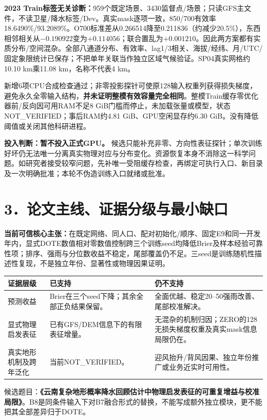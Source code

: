\documentclass[UTF8,a4paper,10pt,fontset=none]{ctexart}
\begin{document}
\textbf{2023 Train标签无关诊断：}959个既定场景、3430监督点/场景；只读GFS主文件，不读卫星/降水标签/Dev。真实mask逐项一致，850/700有效率18.6490\%/93.2089\%。O700标准差从0.266514降至0.211836（约减少20.5\%），东西相邻相关从$-0.190922$变为$+0.114056$；联合置乱为$+0.001210$。因此两方案都有实质分布/空间混杂。全部八通道分布、有效率、lag1/3相关、海拔/经纬、月/UTC/固定象限统计已保存；不把单年关联当作独立区域气候验证。SP04真实网格约10.10 km乘11.08 km，名称不代表4 km。

新增6项CPU合成检查通过；非零投影探针可使原128输入权重列获得损失梯度，避免永久全零输入结构，\textbf{并未证明整模有效容量完全相同}。整模Train缓存零优化器前/反向因可用RAM不足8 GiB门槛而停止，未加载张量或模型，状态NOT\_VERIFIED；事后RAM约4.81 GiB、GPU空闲显存约6.30 GiB。没有降低阈值或关闭其他科研进程。

\textbf{投入判断：暂不投入正式GPU。} 候选只能补充非零、方向性表征探针；单次训练好坏仍无法唯一分离真实物理对应与分布变化。资源恢复本身不消除这一科学问题。如研究者接受较窄问题，先补唯一受阻缓存检查，再绑定可执行入口、新目录及一次明确批准；本轮不伪造训练入口就绪或批准。
\newpage

\section*{3．论文主线、证据分级与最小缺口}
\textbf{当前可信核心主张：}在既定网络、同人口、配对初始化/顺序、固定E9和同一开发年内，显式DOTE数值相对零数值控制跨三个训练seed均降低Brier及样本经验可靠性项；排序、强雨与分位数收益不稳定，尾部覆盖仍不足。三seed是训练随机性描述性复现，不是独立年份、显著性或物理因果证明。

\begin{tabularx}{\linewidth}{@{}p{32mm}XX@{}}
\toprule
证据层级 & 已支持 & 仍不支持\\
\midrule
预测收益 & Brier在三个seed下降；其余全部正负结果保留。 & 全面优越、稳定20--50强雨改善、尾部校准解决。\\
显式物理启发表征 & 已有GFS/DEM信息下的有限表征增量。 & 无混杂的机制归因；ZERO的128无损失梯度权重及真实mask信息局限仍在。\\
真实地形机制及跨年泛化 & 当前NOT\_VERIFIED。 & 迎风抬升/背风因果、独立年份推广或业务近实时可用性。\\
\bottomrule
\end{tabularx}

候选题目：\textbf{《云南复杂地形概率降水回顾估计中物理启发表征的可重复增益与校准局限》}。B8是同条件输入下对B7融合形式的替换，不能写成额外独立模块，更不能把其全部差异归于DOTE。
\end{document}
